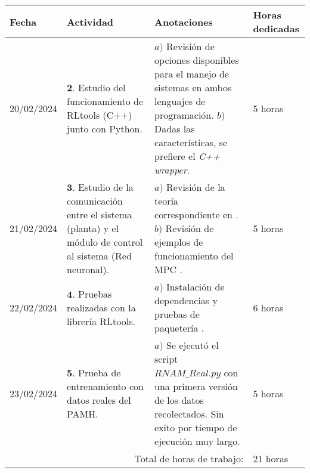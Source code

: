 \documentclass[12pt]{article}
\begin{document}
\begin{minipage}[h]{\textwidth}
	\centering
	\begin{tabularx}{\textwidth}{|p{2cm}|X|X|p{2cm}|} 
		\hline
		\rowcolor{encabezado}
		\textbf{Fecha} & 
		\textbf{Actividad} & 
		\textbf{Anotaciones} & 
		\textbf{Horas dedicadas} \\ \hline
		20/02/2024 & 
	 	$\mathbf{2}.$ Estudio del funcionamiento de RLtools (C++) junto con Python. &
	 	$a)$ Revisión de opciones disponibles para el manejo de sistemas en ambos lenguajes de programación. \newline $b)$ Dadas las características, se prefiere el \textit{C++ wrapper}. \newline & 
	 	5 horas \\
	 	21/02/2024 & 
	 	$\mathbf{3}.$ Estudio de la comunicación entre el sistema (planta) y el módulo de control al sistema (Red neuronal). & 
	 	$a)$ Revisión de la teoría correspondiente en \cite{DataScience}. \newline 
	 	$b)$ Revisión de ejemplos de funcionamiento del MPC \cite{Airdaldi2023}. \newline & 
	 	5 horas \\	
	 	22/02/2024 & 
	 	$\mathbf{4}.$ Pruebas realizadas con la librería RLtools. & 
	 	$a)$ Instalación de dependencias y pruebas de paquetería \cite{rltools}. \newline  & 
	 	6 horas \\
	 	23/02/2024 & 
	 	$\mathbf{5}.$ Prueba de entrenamiento con datos reales del PAMH. & 
	 	$a)$ Se ejecutó el script $RNAM\_Real.py$ con una primera versión de los datos recolectados. Sin exito por tiempo de ejecución muy largo. \newline & 
	 	5 horas \\
	 	\hline
		\multicolumn{3}{|r|}{Total de horas de trabajo:} & 21 horas \\ 
	 	\hline                 
	\end{tabularx}
\end{minipage}


\newpage
\end{document}
